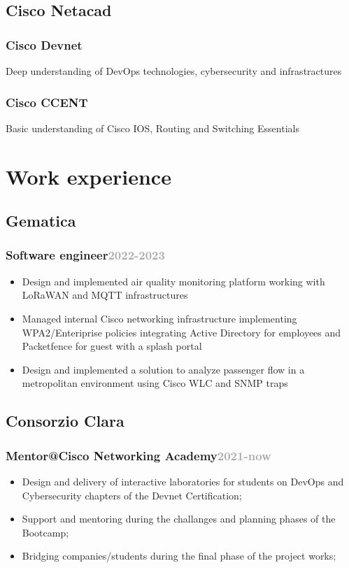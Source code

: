 \documentclass[11pt,a4paper]{article}
\begin{document}
\subsection{Cisco Netacad}
\subsubsection{Cisco Devnet} Deep understanding of DevOps technologies, cybersecurity and infrastractures
\subsubsection{Cisco CCENT} Basic understanding of Cisco IOS, Routing and Switching Essentials

\section*{Work experience}
\subsection{Gematica}
\subsubsection{Software engineer\hfill \textcolor{darkgray}{\small{2022-2023}}}
\begin{itemize}
  \item Design and implemented air quality monitoring platform working with LoRaWAN and MQTT infrastructures
  \item Managed internal Cisco networking infrastructure implementing WPA2/Enteriprise policies integrating Active Directory for employees and Packetfence for guest with a splash portal
  \item Design and implemented a solution to analyze passenger flow in a metropolitan environment using Cisco WLC and SNMP traps
\end{itemize}

\subsection{Consorzio Clara}
\subsubsection{Mentor@Cisco Networking Academy\hfill \textcolor{darkgray}{\small{2021-now}}}

\begin{itemize}
  \item Design and delivery of interactive laboratories for students on DevOps and Cybersecurity chapters of the Devnet Certification;
  \item Support and mentoring during the challanges and planning phases of the Bootcamp;
  \item Bridging companies/students during the final phase of the project works;
\end{itemize}
\end{document}
